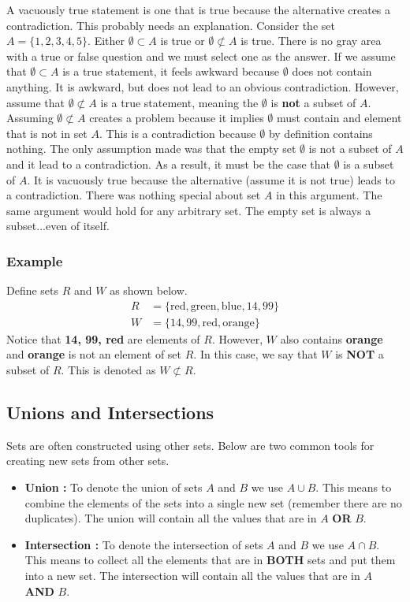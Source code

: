 A vacuously true statement is one that is true because the alternative creates a contradiction. This probably needs an explanation.  Consider the set $A = \{1,2,3,4,5\}$.  Either $\emptyset \subset A$ is true or $\emptyset \not\subset A$ is true.  There is no gray area with a true or false question and we must select one as the answer.  If we assume that $\emptyset \subset A$ is a true statement, it feels awkward because $\emptyset$ does not contain anything.  It is awkward, but does not lead to an obvious contradiction.  However, assume that $\emptyset \not\subset A$ is a true statement, meaning the $\emptyset$ is \textbf{not} a subset of $A$. Assuming $\emptyset \not\subset A$ creates a problem because it implies $\emptyset$ must contain and element that is not in set $A$.  This is a contradiction because $\emptyset$ by definition contains nothing.  The only assumption made was that the empty set $\emptyset$ is not a subset of $A$ and it lead to a contradiction.  As a result, it must be the case that $\emptyset$ is a subset of $A$.   It is vacuously true because the alternative (assume it is not true) leads to a contradiction.    There was nothing special about set $A$ in this argument.  The same argument would hold for any arbitrary set.  The empty set is always a subset...even of itself.

\subsubsection*{Example}
Define sets $R$ and $W$ as shown below.
\begin{align*}
    R &= \{\text{red}, \text{green}, \text{blue}, 14, 99\}\\
    W &= \{14, 99, \text{red}, \text{orange}\}
\end{align*}
Notice that \textbf{14, 99, red} are elements of $R$.  However, $W$ also contains \textbf{orange} and \textbf{orange} is not an element of set $R$.  In this case, we say that $W$ is \textbf{NOT} a subset of $R$.  This is denoted as $W \not\subset R$.

\subsection*{Unions and Intersections}
Sets are often constructed using other sets.  Below are two common tools for creating new sets from other sets.
\begin{itemize}
    \item \textbf{Union : }  To denote the union of sets $A$ and $B$ we use $A \cup B$.  This means to combine the elements of the sets into a single new set (remember there are no duplicates). The union will contain all the values that are in $A$  \textbf{OR} $B$.
    \item \textbf{Intersection : } To denote the intersection of sets $A$ and $B$ we use $A \cap B$.  This means to collect all the elements that are in \textbf{BOTH} sets and put them into a new set. The intersection will contain all the values that are in $A$ \textbf{AND} $B$.
\end{itemize}

